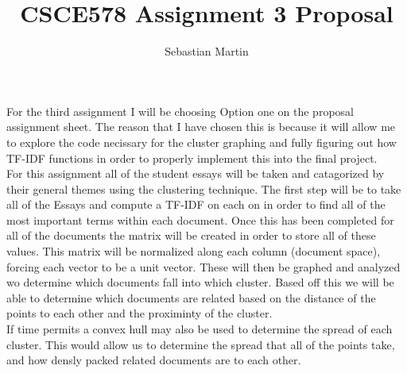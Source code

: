 \documentclass{article}
\title{
CSCE578 Assignment 3 Proposal
}
\author{Sebastian Martin}
\begin{document}
\maketitle

\begin{addmargin}[4em]{4em}
For the third assignment I will be choosing Option one on the proposal assignment sheet. The reason that I have chosen this is because it will allow me to explore the code necissary for the cluster graphing and fully figuring out how TF-IDF functions in order to properly implement this into the final project.\\
For this assignment all of the student essays will be taken and catagorized by their general themes using the clustering technique. The first step will be to take all of the Essays and compute a TF-IDF on each on in order to find all of the most important terms within each document. Once this has been completed for all of the documents the matrix will be created in order to store all of these values. This matrix will be normalized along each column (document space), forcing each vector to be a unit vector. These will then be graphed and analyzed wo determine which documents fall into which cluster. Based off this we will be able to determine which documents are related based on the distance of the points to each other and the proximinty of the cluster.\\
If time permits a convex hull may also be used to determine the spread of each cluster. This would allow us to determine the spread that all of the points take, and how densly packed related documents are to each other.
\end{addmargin}
\end{document}
